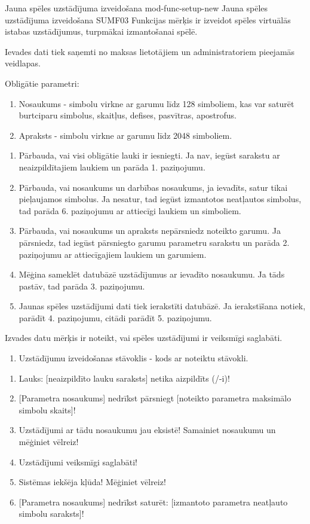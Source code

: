 \moduleFunctionTable
{Jauna spēles uzstādījuma izveidošana}
{mod-func-setup-new}
{Jauna spēles uzstādījuma izveidošana}
{SUMF03}
{
	Funkcijas mērķis ir izveidot spēles virtuālās istabas uzstādījumus, turpmākai izmantošanai spēlē.
}
{
	Ievades dati tiek saņemti no maksas lietotājiem un administratoriem pieejamās veidlapas.

	Obligātie parametri:
	\begin{enumerate}
		\item Nosaukums - simbolu virkne ar garumu līdz 128 simboliem, kas var saturēt burtciparu simbolus, skaitļus, defises, pasvītras, apostrofus.
		\item Apraksts - simbolu virkne ar garumu līdz 2048 simboliem.
	\end{enumerate}
}
{
	\begin{enumerate}
		\item Pārbauda, vai visi obligātie lauki ir iesniegti.
		      Ja nav, iegūst sarakstu ar neaizpildītajiem laukiem un parāda 1. paziņojumu.
		\item Pārbauda, vai nosaukums un darbības nosaukums, ja ievadīts, satur tikai pieļaujamos simbolus.
		      Ja nesatur, tad iegūst izmantotos neatļautos simbolus, tad parāda 6. paziņojumu ar attiecīgi laukiem un simboliem.
		\item Pārbauda, vai nosaukums un apraksts nepārsniedz noteikto garumu.
		      Ja pārsniedz, tad iegūst pārsniegto garumu parametru sarakstu un parāda 2. paziņojumu ar attiecīgajiem laukiem un garumiem.
		\item Mēģina sameklēt datubāzē uzstādījumus ar ievadīto nosaukumu.
		      Ja tāds pastāv, tad parāda 3. paziņojumu.
		\item Jaunas spēles uzstādījumi dati tiek ierakstīti datubāzē.
		      Ja ierakstīšana notiek, parādīt 4. paziņojumu, citādi parādīt 5. paziņojumu.
	\end{enumerate}
}
{
	Izvades datu mērķis ir noteikt, vai spēles uzstādījumi ir veiksmīgi saglabāti.
	\begin{enumerate}
		\item Uzstādījumu izveidošanas stāvoklis - kods ar noteiktu stāvokli.
	\end{enumerate}
}
{
	\begin{enumerate}
		\item Lauks: [neaizpildīto lauku saraksts] netika aizpildīts (/-i)!
		\item {}[Parametra nosaukums] nedrīkst pārsniegt [noteikto parametra maksimālo simbolu skaits]!
		\item Uzstādījumi ar tādu nosaukumu jau eksistē! Samainiet nosaukumu un mēģiniet vēlreiz!
		\item Uzstādījumi veiksmīgi saglabāti!
		\item Sistēmas iekšēja kļūda! Mēģiniet vēlreiz!
		\item {}[Parametra nosaukums] nedrīkst saturēt: [izmantoto parametra neatļauto simbolu saraksts]!
	\end{enumerate}
}
